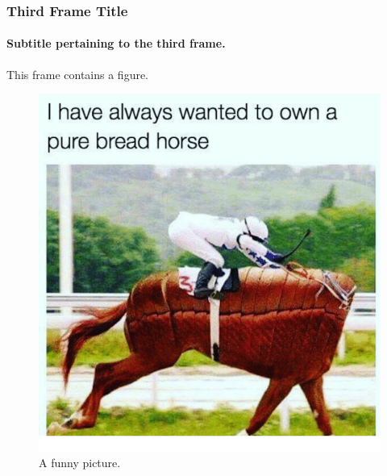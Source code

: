 \documentclass[aspectratio=169]{beamer}
\begin{document}
\begin{frame}
\frametitle{Third Frame Title}
\framesubtitle{Subtitle pertaining to the third frame.}

This frame contains a figure.

\begin{figure}[H]
\centering
{}
    \includegraphics[height=0.5\textheight]{../img/funny.png}
\caption{A funny picture.}
\end{figure}

\end{frame}
\end{document}
